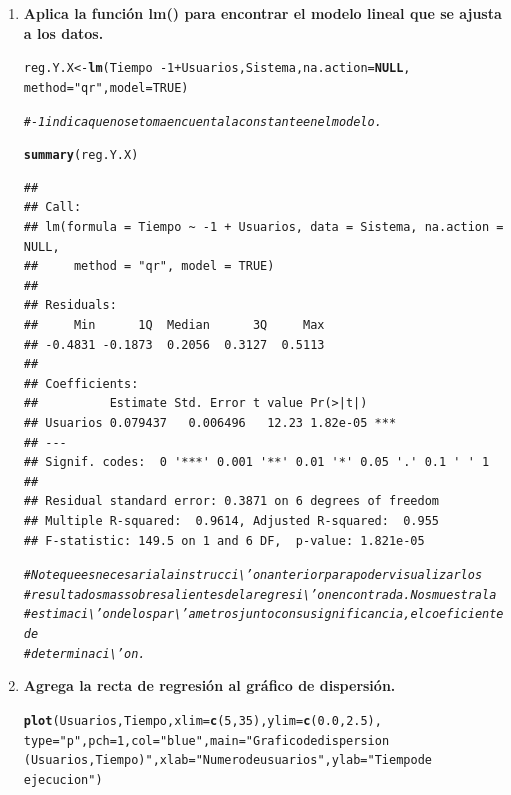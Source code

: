 \documentclass[12pt,letterpaper]{article}\usepackage[]{graphicx}\usepackage[]{color}
\makeatletter
\newcommand{\hlnum}[1]{\textcolor[rgb]{0.686,0.059,0.569}{#1}}%
\newcommand{\hlstr}[1]{\textcolor[rgb]{0.192,0.494,0.8}{#1}}%
\newcommand{\hlcom}[1]{\textcolor[rgb]{0.678,0.584,0.686}{\textit{#1}}}%
\newcommand{\hlopt}[1]{\textcolor[rgb]{0,0,0}{#1}}%
\newcommand{\hlstd}[1]{\textcolor[rgb]{0.345,0.345,0.345}{#1}}%
\newcommand{\hlkwa}[1]{\textcolor[rgb]{0.161,0.373,0.58}{\textbf{#1}}}%
\newcommand{\hlkwb}[1]{\textcolor[rgb]{0.69,0.353,0.396}{#1}}%
\newcommand{\hlkwc}[1]{\textcolor[rgb]{0.333,0.667,0.333}{#1}}%
\newcommand{\hlkwd}[1]{\textcolor[rgb]{0.737,0.353,0.396}{\textbf{#1}}}%
\newenvironment{kframe}{%
 \def\at@end@of@kframe{}%
 \ifinner\ifhmode%
  \def\at@end@of@kframe{\end{minipage}}%
  \begin{minipage}{\columnwidth}%
 \fi\fi%
 \def\FrameCommand##1{\hskip\@totalleftmargin \hskip-\fboxsep
 \colorbox{shadecolor}{##1}\hskip-\fboxsep
     \hskip-\linewidth \hskip-\@totalleftmargin \hskip\columnwidth}%
 \MakeFramed {\advance\hsize-\width
   \@totalleftmargin\z@ \linewidth\hsize
   \@setminipage}}%
 {\par\unskip\endMakeFramed%
 \at@end@of@kframe}
\newenvironment{knitrout}{}{} %
\makeatother
\begin{document}
\begin{enumerate}
\item\textbf{Aplica la funci\'on lm() para encontrar el modelo lineal que se ajusta a los datos.}

\begin{knitrout}
\color{fgcolor}\begin{kframe}
\begin{alltt}
\hlstd{reg.Y.X} \hlkwb{<-} \hlkwd{lm}\hlstd{(Tiempo} \hlopt{~ -}\hlnum{1} \hlopt{+} \hlstd{Usuarios, Sistema,} \hlkwc{na.action}\hlstd{=}\hlkwa{NULL}\hlstd{,}
              \hlkwc{method}\hlstd{=}\hlstr{"qr"}\hlstd{,} \hlkwc{model}\hlstd{=}\hlnum{TRUE}\hlstd{)}

\hlcom{#-1 indica que no se toma en cuenta la constante en el modelo. }

\hlkwd{summary}\hlstd{(reg.Y.X)}
\end{alltt}
\begin{verbatim}
## 
## Call:
## lm(formula = Tiempo ~ -1 + Usuarios, data = Sistema, na.action = NULL, 
##     method = "qr", model = TRUE)
## 
## Residuals:
##     Min      1Q  Median      3Q     Max 
## -0.4831 -0.1873  0.2056  0.3127  0.5113 
## 
## Coefficients:
##          Estimate Std. Error t value Pr(>|t|)    
## Usuarios 0.079437   0.006496   12.23 1.82e-05 ***
## ---
## Signif. codes:  0 '***' 0.001 '**' 0.01 '*' 0.05 '.' 0.1 ' ' 1
## 
## Residual standard error: 0.3871 on 6 degrees of freedom
## Multiple R-squared:  0.9614,	Adjusted R-squared:  0.955 
## F-statistic: 149.5 on 1 and 6 DF,  p-value: 1.821e-05
\end{verbatim}
\begin{alltt}
\hlcom{# Note que es necesaria la instrucci\textbackslash{}'on anterior para poder visualizar los }
\hlcom{# resultados mas sobre salientes de la regresi\textbackslash{}'on encontrada. Nos muestra la}
\hlcom{# estimaci\textbackslash{}'on de los par\textbackslash{}'ametros junto con su significancia, el coeficiente de}
\hlcom{# determinaci\textbackslash{}'on. }
\end{alltt}
\end{kframe}
\end{knitrout}

\item\textbf{Agrega la recta de regresi\'on al gr\'afico de dispersi\'on.}

\begin{knitrout}
\color{fgcolor}\begin{kframe}
\begin{alltt}
\hlkwd{plot}\hlstd{(Usuarios, Tiempo,} \hlkwc{xlim}\hlstd{=} \hlkwd{c}\hlstd{(}\hlnum{5}\hlstd{,} \hlnum{35}\hlstd{),} \hlkwc{ylim}\hlstd{=} \hlkwd{c}\hlstd{(}\hlnum{0.0}\hlstd{,} \hlnum{2.5}\hlstd{),}
\hlkwc{type} \hlstd{=} \hlstr{"p"}\hlstd{,} \hlkwc{pch}\hlstd{=}\hlnum{1}\hlstd{,} \hlkwc{col} \hlstd{=} \hlstr{"blue"}\hlstd{,} \hlkwc{main} \hlstd{=} \hlstr{"Grafico de dispersion 
(Usuarios, Tiempo)"}\hlstd{,} \hlkwc{xlab}\hlstd{=}\hlstr{"Numero de usuarios"}\hlstd{,} \hlkwc{ylab}\hlstd{=}\hlstr{"Tiempo de 
ejecucion"}\hlstd{)}


\end{alltt}
\end{kframe}
\end{knitrout}
\end{enumerate}
\end{document}
